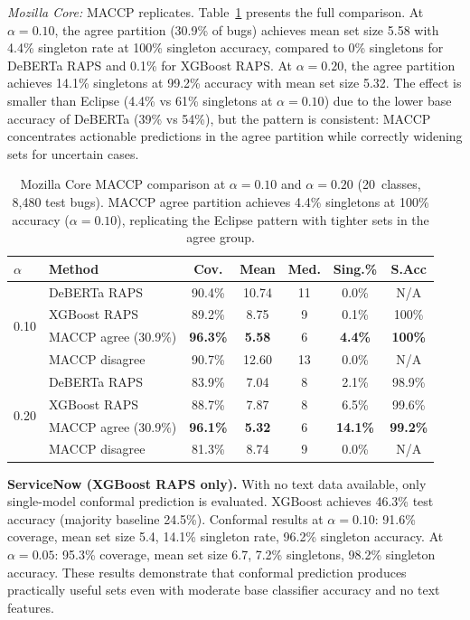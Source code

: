 \documentclass[conference]{IEEEtran}
\begin{document}
\smallskip\noindent\textit{Mozilla Core:} MACCP replicates. Table~\ref{tab:mozilla-maccp} presents the full comparison. At $\alpha{=}0.10$, the agree partition (30.9\% of bugs) achieves mean set size 5.58 with 4.4\% singleton rate at 100\% singleton accuracy, compared to 0\% singletons for DeBERTa RAPS and 0.1\% for XGBoost RAPS. At $\alpha{=}0.20$, the agree partition achieves 14.1\% singletons at 99.2\% accuracy with mean set size 5.32. The effect is smaller than Eclipse (4.4\% vs 61\% singletons at $\alpha{=}0.10$) due to the lower base accuracy of DeBERTa (39\% vs 54\%), but the pattern is consistent: MACCP concentrates actionable predictions in the agree partition while correctly widening sets for uncertain cases.

\begin{table}[t]
\caption{Mozilla Core MACCP comparison at $\alpha = 0.10$ and $\alpha = 0.20$ (20~classes, 8{,}480 test bugs). MACCP agree partition achieves 4.4\% singletons at 100\% accuracy ($\alpha{=}0.10$), replicating the Eclipse pattern with tighter sets in the agree group.}
\label{tab:mozilla-maccp}
\centering
\footnotesize
\setlength{\tabcolsep}{2.5pt}
\begin{tabular}{@{}llccccc@{}}
\toprule
$\alpha$ & \textbf{Method} & \textbf{Cov.} & \textbf{Mean} & \textbf{Med.} & \textbf{Sing.\%} & \textbf{S.Acc} \\
\midrule
\multirow{4}{*}{0.10}
& DeBERTa RAPS       & 90.4\% & 10.74 & 11 & 0.0\% & N/A \\
& XGBoost RAPS        & 89.2\% & 8.75 & 9 & 0.1\% & 100\% \\
& MACCP agree (30.9\%) & \textbf{96.3\%} & \textbf{5.58} & 6 & \textbf{4.4\%} & \textbf{100\%} \\
& MACCP disagree       & 90.7\% & 12.60 & 13 & 0.0\% & N/A \\
\midrule
\multirow{4}{*}{0.20}
& DeBERTa RAPS        & 83.9\% & 7.04 & 8 & 2.1\% & 98.9\% \\
& XGBoost RAPS        & 88.7\% & 7.87 & 8 & 6.5\% & 99.6\% \\
& MACCP agree (30.9\%) & \textbf{96.1\%} & \textbf{5.32} & 6 & \textbf{14.1\%} & \textbf{99.2\%} \\
& MACCP disagree       & 81.3\% & 8.74 & 9 & 0.0\% & N/A \\
\bottomrule
\end{tabular}
\end{table}

\smallskip\noindent\textbf{ServiceNow (XGBoost RAPS only).} With no text data available, only single-model conformal prediction is evaluated. XGBoost achieves 46.3\% test accuracy (majority baseline 24.5\%). Conformal results at $\alpha = 0.10$: 91.6\% coverage, mean set size 5.4, 14.1\% singleton rate, 96.2\% singleton accuracy. At $\alpha = 0.05$: 95.3\% coverage, mean set size 6.7, 7.2\% singletons, 98.2\% singleton accuracy. These results demonstrate that conformal prediction produces practically useful sets even with moderate base classifier accuracy and no text features.
\end{document}
